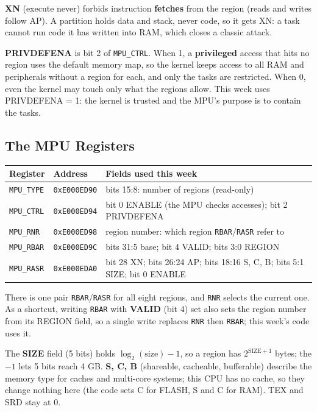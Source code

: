 \textbf{XN} (execute never) forbids instruction \textbf{fetches} from the region (reads and writes follow AP). A partition holds data and stack, never code, so it gets XN: a task cannot run code it has written into RAM, which closes a classic attack.

\textbf{PRIVDEFENA} is bit 2 of \texttt{MPU\_CTRL}. When 1, a \textbf{privileged} access that hits no region uses the default memory map, so the kernel keeps access to all RAM and peripherals without a region for each, and only the tasks are restricted. When 0, even the kernel may touch only what the regions allow. This week uses PRIVDEFENA = 1: the kernel is trusted and the MPU's purpose is to contain the tasks.

\subsection{The MPU Registers}

\begin{center}
\begin{tabular}{|l|l|p{7cm}|}
\hline
\textbf{Register} & \textbf{Address} & \textbf{Fields used this week} \\
\hline
\texttt{MPU\_TYPE} & \texttt{0xE000ED90} & bits 15:8: number of regions (read-only) \\
\hline
\texttt{MPU\_CTRL} & \texttt{0xE000ED94} & bit 0 ENABLE (the MPU checks accesses); bit 2 PRIVDEFENA \\
\hline
\texttt{MPU\_RNR} & \texttt{0xE000ED98} & region number: which region \texttt{RBAR}/\texttt{RASR} refer to \\
\hline
\texttt{MPU\_RBAR} & \texttt{0xE000ED9C} & bits 31:5 base; bit 4 VALID; bits 3:0 REGION \\
\hline
\texttt{MPU\_RASR} & \texttt{0xE000EDA0} & bit 28 XN; bits 26:24 AP; bits 18:16 S, C, B; bits 5:1 SIZE; bit 0 ENABLE \\
\hline
\end{tabular}
\end{center}

There is one pair \texttt{RBAR}/\texttt{RASR} for all eight regions, and \texttt{RNR} selects the current one. As a shortcut, writing \texttt{RBAR} with \textbf{VALID} (bit 4) set also sets the region number from its REGION field, so a single write replaces \texttt{RNR} then \texttt{RBAR}; this week's code uses it.

The \textbf{SIZE} field (5 bits) holds $\log_2(\text{size}) - 1$, so a region has $2^{\text{SIZE}+1}$ bytes; the $- 1$ lets 5 bits reach 4 GB. \textbf{S, C, B} (shareable, cacheable, bufferable) describe the memory type for caches and multi-core systems; this CPU has no cache, so they change nothing here (the code sets C for FLASH, S and C for RAM). TEX and SRD stay at 0.

